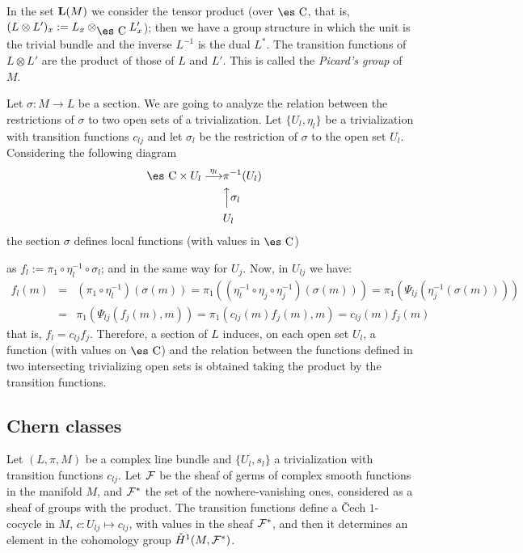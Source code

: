 \documentclass[12pt]{article}
\theoremstyle{plain}
\def\beann{\begin{eqnarray*}}
\def\eeann{\end{eqnarray*}}
\def\mapping#1{\mathrel{\mathop{\longrightarrow}\limits^{#1}}}
\def\Complex{\mbox{\es C}}
\begin{document}
In the set ${\bf L}(M)$
we consider the tensor product  (over $\Complex$, that is,
$(L \otimes L')_x := L_x \otimes_{\Complex}L'_x$);
then we have a group structure in which
the unit is the trivial bundle and the inverse $L^{-1}$ is the dual
$L^*$.
The transition functions of $L \otimes L'$ are the product of those of
$L$ and $L'$.
This is called the {\it Picard's group} of $M$.

Let $\sigma : M \to L$ be a section. We are going to analyze the
relation
between the restrictions of $\sigma$ to two open sets of a
trivialization.
Let $\{ U_l,\eta_l \}$ be a trivialization with transition functions
$c_{l j}$ and let $\sigma_l$ be the restriction of $\sigma$ to the open
set $U_l$.
Considering the following diagram
\beann
\Complex \times U_l \mapping{\eta_l} &\pi^{-1}(U_l)&
\\
& \Big\uparrow  \sigma_l &
\\
& U_l &
\eeann
the section $\sigma$ defines local functions (with values in $\Complex$)

as
$f_l := \pi_1 \circ \eta_l^{-1} \circ \sigma_l$;
and in the same way for $U_j$. Now, in $U_{l j}$ we have:
\beann
f_l(m)
&=&
(\pi_1 \circ \eta_l^{-1})(\sigma (m)) =
\pi_1((\eta_l^{-1} \circ \eta_j \circ \eta_j^{-1})(\sigma (m)))=
\pi_1(\Psi_{l j}(\eta_j^{-1}(\sigma (m))))
\\ &=&
\pi_1(\Psi_{l j}(f_j(m),m))=
\pi_1(c_{l j}(m)f_j(m),m) =
c_{l j}(m)f_j(m)
\eeann
that is, $f_l = c_{l j}f_j$.
Therefore, a section of $L$ induces, on each open set $U_l$,
a function (with values on $\Complex$) and the relation between the
functions defined
in two intersecting trivializing open sets
is obtained taking the product by the transition functions.



\subsection{Chern classes}


Let $(L,\pi ,M)$ be a complex line bundle and $\{ U_l,s_l \}$ a
trivialization
with transition functions $c_{l j}$. Let ${\cal F}$ be
the sheaf of germs of complex smooth functions
in the manifold $M$, and ${\cal F}^*$ the set of the nowhere-vanishing
ones,
considered as a sheaf of groups with the product.
The transition functions define a \v{C}ech $1$-cocycle in $M$,
$c:U_{l j} \mapsto c_{l j}$, with values in the sheaf ${\cal F}^*$,
and then it determines an element in the cohomology group
$\check{H}^1(M,{\cal F}^*)$.
\end{document}
